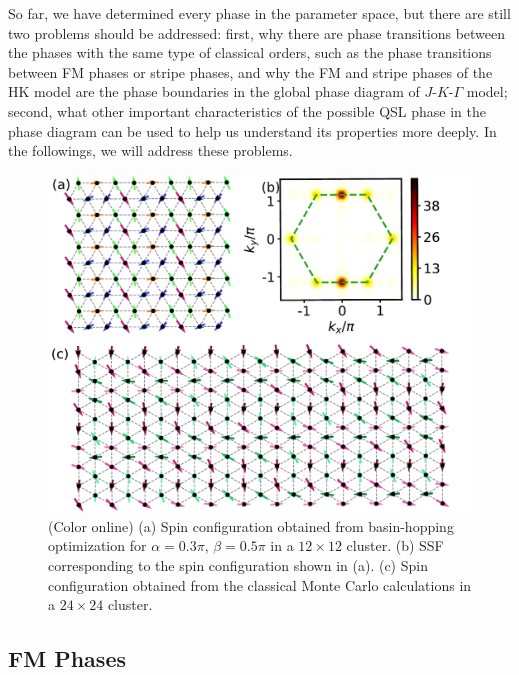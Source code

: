 \documentclass[aps,prb,reprint,amsfonts,amsmath,amssymb,showpacs,groupedaddress,superscriptaddress]{revtex4-1}
\begin{document}
So far, we have determined every phase in the parameter space, but there are still two problems should be addressed: first, why there are phase transitions between the phases with the same type of classical orders, such as the phase transitions between FM phases or stripe phases, and why the FM and stripe phases of the HK model are the phase boundaries in the global phase diagram of $J$-$K$-$\Gamma$ model; second, what other important characteristics of the possible QSL phase in the phase diagram can be used to help us understand its properties more deeply. In the followings, we will address these problems.

\begin{figure}
    \centering
    \includegraphics[width=0.95\columnwidth]{ModulatedStripe.pdf}
    \caption{\label{fig:ModulatedStripe}(Color online) (a) Spin configuration obtained from basin-hopping optimization for $\alpha=0.3\pi$, $\beta=0.5\pi$ in a $12 \times 12$ cluster. (b) SSF corresponding to the spin configuration shown in (a). (c) Spin configuration obtained from the classical Monte Carlo calculations in a $24 \times 24$ cluster.}
\end{figure}

\subsection{\label{subsec:FMPhases}FM Phases}
\end{document}
